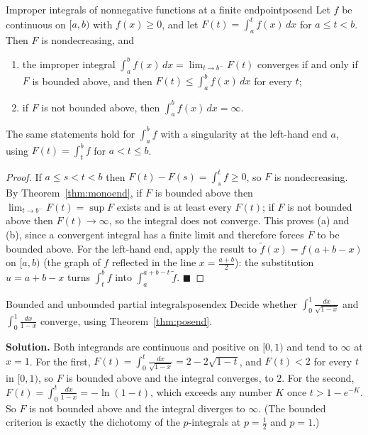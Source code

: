 \documentclass[11pt]{article}
\begin{document}
\begin{thm}{Improper integrals of nonnegative functions at a finite endpoint}{posend}
Let $f$ be continuous on $[a,b)$ with $f(x)\ge0$, and let $F(t)=\int_a^tf(x)\,dx$ for $a\le t<b$. Then $F$ is nondecreasing, and
\begin{enumerate}[label=(\alph*)]
  \item the improper integral $\int_a^bf(x)\,dx=\lim_{t\to b^-}F(t)$ converges if and only if $F$ is bounded above, and then $F(t)\le\int_a^bf(x)\,dx$ for every $t$;
  \item if $F$ is not bounded above, then $\int_a^bf(x)\,dx=\infty$.
\end{enumerate}
The same statements hold for $\int_a^bf$ with a singularity at the left-hand end $a$, using $F(t)=\int_t^bf$ for $a<t\le b$.
\end{thm}
\begin{proof}
If $a\le s<t<b$ then $F(t)-F(s)=\int_s^tf\ge0$, so $F$ is nondecreasing. By Theorem~\ref{thm:monoend}, if $F$ is bounded above then $\lim_{t\to b^-}F(t)=\sup F$ exists and is at least every $F(t)$; if $F$ is not bounded above then $F(t)\to\infty$, so the integral does not converge. This proves (a) and (b), since a convergent integral has a finite limit and therefore forces $F$ to be bounded above. For the left-hand end, apply the result to $\tilde f(x)=f(a+b-x)$ on $[a,b)$ (the graph of $f$ reflected in the line $x=\frac{a+b}2$): the substitution $u=a+b-x$ turns $\int_t^bf$ into $\int_a^{a+b-t}\tilde f$. $\blacksquare$
\end{proof}

\begin{exmp}{Bounded and unbounded partial integrals}{posendex}
Decide whether $\int_0^1\frac{dx}{\sqrt{1-x}}$ and $\int_0^1\frac{dx}{1-x}$ converge, using Theorem~\ref{thm:posend}.

\textbf{Solution.} Both integrands are continuous and positive on $[0,1)$ and tend to $\infty$ at $x=1$. For the first, $F(t)=\int_0^t\frac{dx}{\sqrt{1-x}}=2-2\sqrt{1-t}$, and $F(t)<2$ for every $t$ in $[0,1)$, so $F$ is bounded above and the integral converges, to $2$.
For the second, $F(t)=\int_0^t\frac{dx}{1-x}=-\ln(1-t)$, which exceeds any number $K$ once $t>1-e^{-K}$. So $F$ is not bounded above and the integral diverges to $\infty$. (The bounded criterion is exactly the dichotomy of the $p$-integrals at $p=\frac12$ and $p=1$.)
\end{exmp}
\end{document}

